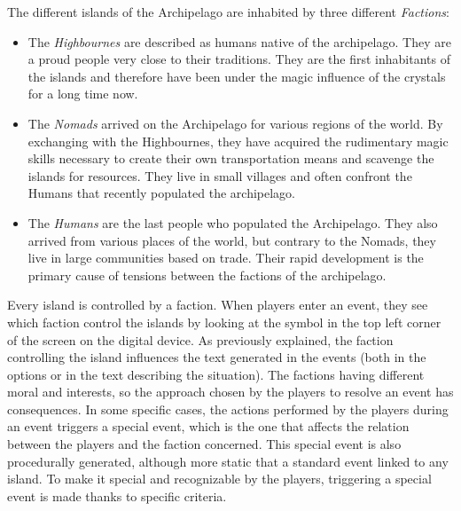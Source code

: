 The different islands of the Archipelago are inhabited by three different \textit{Factions}:
\begin{itemize}
\item The \textit{Highbournes} are described as humans native of the archipelago. They are a proud people very close to their traditions. They are the first inhabitants of the islands and therefore have been under the magic influence of the crystals for a long time now.
\item The \textit{Nomads} arrived on the Archipelago for various regions of the world. By exchanging with the Highbournes, they have acquired the rudimentary magic skills necessary to create their own transportation means and scavenge the islands for resources. They live in small villages and often confront the Humans that recently populated the archipelago.
\item The \textit{Humans} are the last people who populated the Archipelago. They also arrived from various places of the world, but contrary to the Nomads, they live in large communities based on trade. Their rapid development is the primary cause of tensions between the factions of the archipelago.
\end{itemize}
Every island is controlled by a faction. When players enter an event, they see which faction control the islands by looking at the symbol in the top left corner of the screen on the digital device. As previously explained, the faction controlling the island influences the text generated in the events (both in the options or in the text describing the situation). The factions having different moral and interests, so the approach chosen by the players to resolve an event has consequences. In some specific cases, the actions performed by the players during an event triggers a special event, which is the one that affects the relation between the players and the faction concerned. This special event is also procedurally generated, although more static that a standard event linked to any island. To make it special and recognizable by the players, triggering a special event is made thanks to specific criteria.

